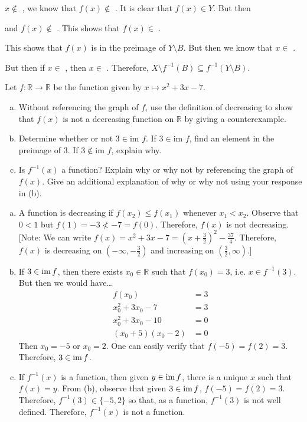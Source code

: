 \documentclass[11pt,letterpaper]{article}
\begin{document}
$x \notin$ , we know that $f(x) \notin$ . It is clear that $f(x) \in Y$. But then \pspace

 and $f(x) \notin$ . This shows that $f(x) \in$ . \pspace

This shows that $f(x)$ is in the preimage of $Y \setminus B$. But then we know that $x \in$ . \pspace

But then if $x \in$ , then $x \in$ . Therefore, $X \setminus f^{-1}(B) \subseteq f^{-1}(Y \setminus B)$.



\newpage



 Let $f: \mathbb{R} \to \mathbb{R}$ be the function given by $x \mapsto x^2 + 3x - 7$. 
	\begin{enumerate}[(a)]
	\item Without referencing the graph of $f$, use the definition of decreasing to show that $f(x)$ is not a decreasing function on $\mathbb{R}$ by giving a counterexample. 
	\item Determine whether or not $3 \in \text{im } f$. If $3 \in \text{im } f$, find an element in the preimage of 3. If $3 \notin \text{im } f$, explain why. 
	\item Is $f^{-1}(x)$ a function? Explain why or why not by referencing the graph of $f(x)$. Give an additional explanation of why or why not using your response in (b). 
	\end{enumerate} \pspace

\sol 
\begin{enumerate}[(a)]
\item A function is decreasing if $f(x_2) \leq f(x_1)$ whenever $x_1 < x_2$. Observe that $0 < 1$ but $f(1)= -3 \not< -7= f(0)$. Therefore, $f(x)$ is not decreasing. [Note: We can write $f(x)= x^2 + 3x - 7= \left(x + \frac{3}{2} \right)^2 - \frac{37}{4}$. Therefore, $f(x)$ is decreasing on $(-\infty, -\frac{3}{2})$ and increasing on $(\frac{3}{2}, \infty)$.] \pspace

\item If $3 \in \operatorname{im} f$, then there exists $x_0 \in \mathbb{R}$ such that $f(x_0)= 3$, i.e. $x \in f^{-1}(3)$. But then we would have\dots
	\[
	\begin{aligned}
	f(x_0)&= 3 \\[0.3cm]
	x_0^2 + 3x_0 - 7&= 3 \\[0.3cm]
	x_0^2 + 3x_0 -10&= 0 \\[0.3cm]
	(x_0 + 5)(x_0 - 2)&= 0 
	\end{aligned}
	\]
Then $x_0= -5$ or $x_0= 2$. One can easily verify that $f(-5)= f(2)= 3$. Therefore, $3 \in \operatorname{im} f$. \pspace

\item If $f^{-1}(x)$ is a function, then given $y \in \operatorname{im} f$, there is a unique $x$ such that $f(x)= y$. From (b), observe that given $3 \in \operatorname{im} f$, $f(-5)= f(2)= 3$. Therefore, $f^{-1}(3) \in \{ -5, 2 \}$ so that, as a function, $f^{-1}(3)$ is not well defined. Therefore, $f^{-1}(x)$ is not a function. 
\end{enumerate}
\end{document}
